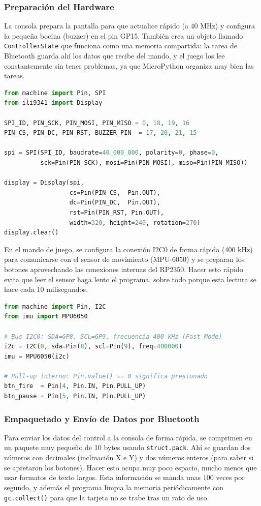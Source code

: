 \subsubsection{Preparación del Hardware}
La consola prepara la pantalla para que actualice rápido (a 40 MHz) y configura la pequeña bocina (buzzer) en el pin GP15. También crea un objeto llamado \texttt{ControllerState} que funciona como una memoria compartida: la tarea de Bluetooth guarda ahí los datos que recibe del mando, y el juego los lee constantemente sin tener problemas, ya que MicroPython organiza muy bien las tareas.

\begin{lstlisting}[language=Python, caption={Inicialización de hardware SPI y display en la Consola}]
from machine import Pin, SPI
from ili9341 import Display

SPI_ID, PIN_SCK, PIN_MOSI, PIN_MISO = 0, 18, 19, 16
PIN_CS, PIN_DC, PIN_RST, BUZZER_PIN  = 17, 20, 21, 15

spi = SPI(SPI_ID, baudrate=40_000_000, polarity=0, phase=0,
          sck=Pin(PIN_SCK), mosi=Pin(PIN_MOSI), miso=Pin(PIN_MISO))

display = Display(spi,
                  cs=Pin(PIN_CS,  Pin.OUT),
                  dc=Pin(PIN_DC,  Pin.OUT),
                  rst=Pin(PIN_RST, Pin.OUT),
                  width=320, height=240, rotation=270)
display.clear()
\end{lstlisting}

En el mando de juego, se configura la conexión I2C0 de forma rápida (400 kHz) para comunicarse con el sensor de movimiento (MPU-6050) y se preparan los botones aprovechando las conexiones internas del RP2350. Hacer esto rápido evita que leer el sensor haga lento el programa, sobre todo porque esta lectura se hace cada 10 milisegundos.

\begin{lstlisting}[language=Python, caption={Inicialización del bus I2C y los botones en el Mando}]
from machine import Pin, I2C
from imu import MPU6050

# Bus I2C0: SDA=GP8, SCL=GP9, frecuencia 400 kHz (Fast Mode)
i2c = I2C(0, sda=Pin(8), scl=Pin(9), freq=400000)
imu = MPU6050(i2c)

# Pull-up interno: Pin.value() == 0 significa presionado
btn_fire  = Pin(4, Pin.IN, Pin.PULL_UP)
btn_pause = Pin(5, Pin.IN, Pin.PULL_UP)
\end{lstlisting}

\subsubsection{Empaquetado y Envío de Datos por Bluetooth}
Para enviar los datos del control a la consola de forma rápida, se comprimen en un paquete muy pequeño de 10 bytes usando \texttt{struct.pack}. Ahí se guardan dos números con decimales (inclinación X e Y) y dos números enteros (para saber si se apretaron los botones). Hacer esto ocupa muy poco espacio, mucho menos que usar formatos de texto largos. Esta información se manda unas 100 veces por segundo, y además el programa limpia la memoria periódicamente con \texttt{gc.collect()} para que la tarjeta no se trabe tras un rato de uso.

